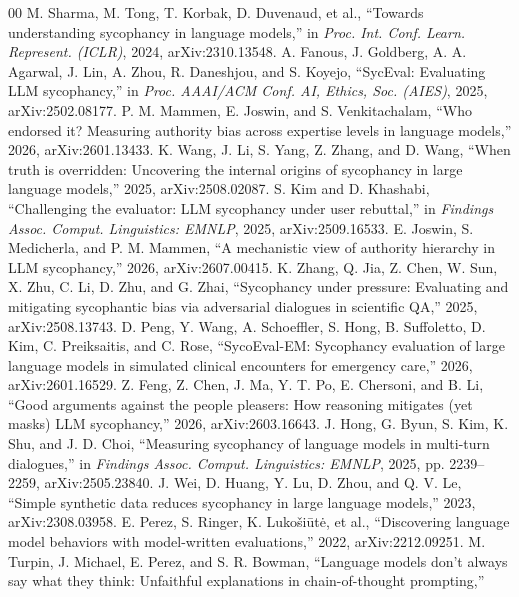 \documentclass{ieeeaccess}
\begin{document}
\begin{thebibliography}{00}
 M. Sharma, M. Tong, T. Korbak, D. Duvenaud, et al., ``Towards
understanding sycophancy in language models,'' in \emph{Proc. Int. Conf. Learn. Represent.
(ICLR)}, 2024, arXiv:2310.13548.
 A. Fanous, J. Goldberg, A. A. Agarwal, J. Lin, A. Zhou, R. Daneshjou,
and S. Koyejo, ``SycEval: Evaluating LLM sycophancy,'' in \emph{Proc. AAAI/ACM Conf. AI,
Ethics, Soc. (AIES)}, 2025, arXiv:2502.08177.
 P. M. Mammen, E. Joswin, and S. Venkitachalam, ``Who endorsed it?
Measuring authority bias across expertise levels in language models,'' 2026,
arXiv:2601.13433.
 K. Wang, J. Li, S. Yang, Z. Zhang, and D. Wang, ``When truth is
overridden: Uncovering the internal origins of sycophancy in large language models,'' 2025,
arXiv:2508.02087.
 S. Kim and D. Khashabi, ``Challenging the evaluator: LLM sycophancy under
user rebuttal,'' in \emph{Findings Assoc. Comput. Linguistics: EMNLP}, 2025,
arXiv:2509.16533.
 E. Joswin, S. Medicherla, and P. M. Mammen, ``A mechanistic view of
authority hierarchy in LLM sycophancy,'' 2026, arXiv:2607.00415.
 K. Zhang, Q. Jia, Z. Chen, W. Sun, X. Zhu, C. Li, D. Zhu, and G. Zhai,
``Sycophancy under pressure: Evaluating and mitigating sycophantic bias via adversarial
dialogues in scientific QA,'' 2025, arXiv:2508.13743.
 D. Peng, Y. Wang, A. Schoeffler, S. Hong, B. Suffoletto, D. Kim,
C. Preiksaitis, and C. Rose, ``SycoEval-EM: Sycophancy evaluation of large language models in
simulated clinical encounters for emergency care,'' 2026, arXiv:2601.16529.
 Z. Feng, Z. Chen, J. Ma, Y. T. Po, E. Chersoni, and B. Li, ``Good arguments
against the people pleasers: How reasoning mitigates (yet masks) LLM sycophancy,'' 2026,
arXiv:2603.16643.
 J. Hong, G. Byun, S. Kim, K. Shu, and J. D. Choi, ``Measuring sycophancy
of language models in multi-turn dialogues,'' in \emph{Findings Assoc. Comput. Linguistics:
EMNLP}, 2025, pp. 2239--2259, arXiv:2505.23840.
 J. Wei, D. Huang, Y. Lu, D. Zhou, and Q. V. Le, ``Simple synthetic data
reduces sycophancy in large language models,'' 2023, arXiv:2308.03958.
 E. Perez, S. Ringer, K. Lukošiūtė, et al., ``Discovering language model
behaviors with model-written evaluations,'' 2022, arXiv:2212.09251.
 M. Turpin, J. Michael, E. Perez, and S. R. Bowman, ``Language models
don't always say what they think: Unfaithful explanations in chain-of-thought prompting,''

\end{thebibliography}
\end{document}
